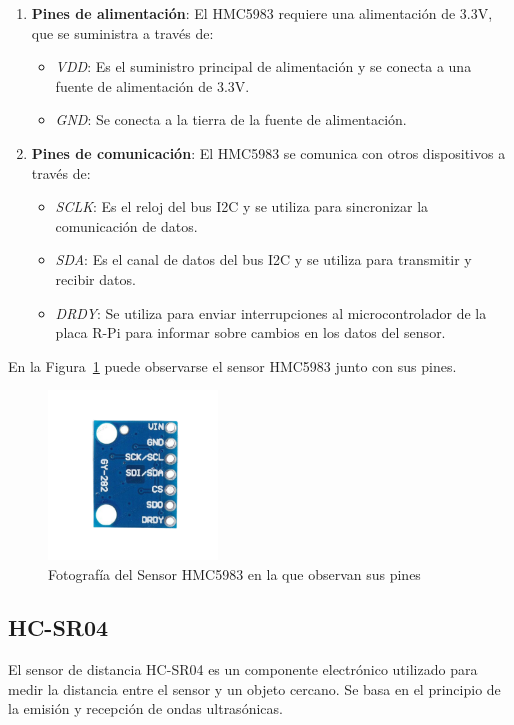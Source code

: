 \begin{enumerate}
\item \textbf{Pines de alimentación}:  El HMC5983 requiere una alimentación de 3.3V, que se suministra a través de:

\begin{itemize}
\item \textit{VDD}: Es el suministro principal de alimentación y se conecta a una fuente de alimentación de 3.3V.
\item \textit{GND}: Se conecta a la tierra de la fuente de alimentación.
\end{itemize}

\item \textbf{Pines de comunicación}: El HMC5983 se comunica con otros dispositivos a través de:

\begin{itemize}
\item \textit{SCLK}: Es el reloj del bus I2C y se utiliza para sincronizar la comunicación de datos.
\item \textit{SDA}: Es el canal de datos del bus I2C y se utiliza para transmitir y recibir datos.
\item \textit{DRDY}: Se utiliza para enviar interrupciones al microcontrolador de la placa R-Pi para informar sobre cambios en los datos del sensor.
\end{itemize}
\end{enumerate}

En la Figura~\ref{fig:hmc5983} puede observarse el sensor HMC5983 junto con sus pines. 
\vspace{2mm}
\begin{figure}[h!]
\centering
\includegraphics[width=0.4\textwidth]{images/hmc5983.png}
\caption [Sensor HMC5983]{Fotografía del Sensor HMC5983 en la que observan sus pines}
\label{fig:hmc5983}
\end{figure}

\subsection{HC-SR04}
El sensor de distancia HC-SR04 es un componente electrónico utilizado para medir la distancia entre el sensor y un objeto cercano. Se basa en el principio de la emisión y recepción de ondas ultrasónicas.

